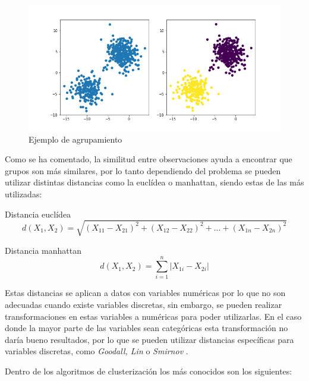 \begin{figure}[H]
    \centering
    \includegraphics[width=12cm]{figs/clustering_example.png}
    \caption{Ejemplo de agrupamiento}
    \label{fig:agrupEj}
\end{figure}

Como se ha comentado, la similitud entre observaciones ayuda a encontrar que grupos son más similares, por lo tanto dependiendo del problema se pueden utilizar distintas distancias como la euclídea o manhattan, siendo estas de las más utilizadas: 

Distancia euclídea
\begin{equation}
    d(X_1, X_2) = \sqrt{(X_{11} - X_{21})^2 + (X_{12} - X_{22})^2 + ... +  (X_{1n} - X_{2n})^2}
\end{equation}

Distancia manhattan
\begin{equation}
    d(X_1, X_2) = \sum_{i=1}^{n}|X_{1i} - X_{2i}|
\end{equation}

Estas distancias se aplican a datos con variables numéricas por lo que no son adecuadas cuando existe variables discretas, sin embargo, se pueden realizar transformaciones en estas variables a numéricas para poder utilizarlas. En el caso donde la mayor parte de las variables sean categóricas esta transformación no daría bueno resultados, por lo que se pueden utilizar distancias específicas para variables discretas, como \textit{Goodall, Lin} o \textit{Smirnov} \cite{boriah2008similarity}.

Dentro de los algoritmos de clusterización los más conocidos son los siguientes:

